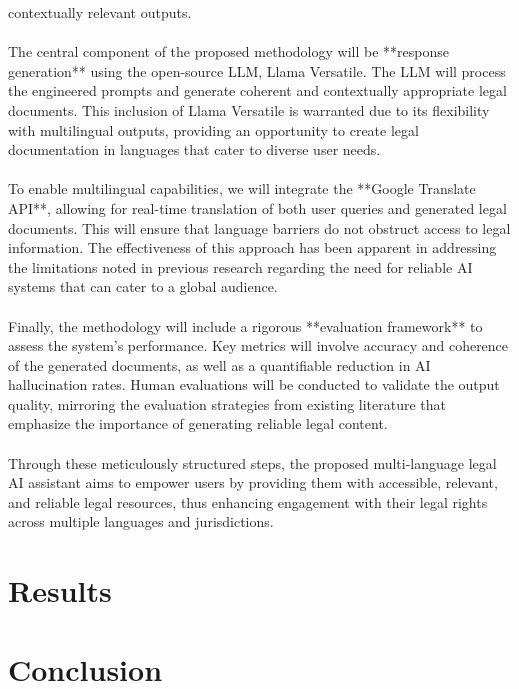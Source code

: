 \documentclass[conference]{IEEEtran}
\begin{document}
contextually relevant outputs.\\\\The central component of the proposed methodology will be **response generation** using the open-source LLM, Llama Versatile. The LLM will process the engineered prompts and generate coherent and contextually appropriate legal documents. This inclusion of Llama Versatile is warranted due to its flexibility with multilingual outputs, providing an opportunity to create legal documentation in languages that cater to diverse user needs. \\\\To enable multilingual capabilities, we will integrate the **Google Translate API**, allowing for real-time translation of both user queries and generated legal documents. This will ensure that language barriers do not obstruct access to legal information. The effectiveness of this approach has been apparent in addressing the limitations noted in previous research regarding the need for reliable AI systems that can cater to a global audience.\\\\Finally, the methodology will include a rigorous **evaluation framework** to assess the system's performance. Key metrics will involve accuracy and coherence of the generated documents, as well as a quantifiable reduction in AI hallucination rates. Human evaluations will be conducted to validate the output quality, mirroring the evaluation strategies from existing literature that emphasize the importance of generating reliable legal content.\\\\Through these meticulously structured steps, the proposed multi-language legal AI assistant aims to empower users by providing them with accessible, relevant, and reliable legal resources, thus enhancing engagement with their legal rights across multiple languages and jurisdictions.

\section{Results}


\section{Conclusion}
\end{document}
